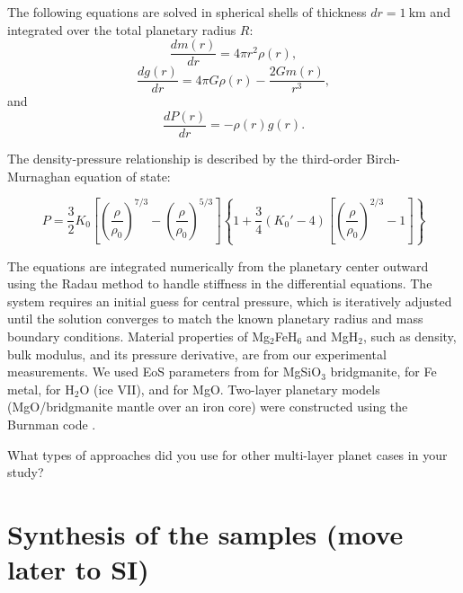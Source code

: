 \documentclass[draft,jgrga,12pt]{agujournal2019}
\begin{document}
The following equations are solved in spherical shells of thickness $dr = 1~\mathrm{km}$ and integrated over the total planetary radius $R$:
\begin{equation}
    \frac{dm(r)}{dr} = 4\pi r^2\rho (r),
\end{equation}
\begin{equation}
    \frac{dg(r)}{dr} = 4 \pi G\rho (r) -\frac{2Gm(r)}{r^3},
\end{equation}
and
\begin{equation}
    \frac{dP(r)}{dr} = -\rho (r) g (r).
\end{equation}
    
The density-pressure relationship is described by the third-order Birch-Murnaghan equation of state:

\begin{equation}
P = \frac{3}{2}K_0\left[\left(\frac{\rho}{\rho_0}\right)^{7/3} - \left(\frac{\rho}{\rho_0}\right)^{5/3}\right]\left\{1 + \frac{3}{4}(K_0' - 4)\left[\left(\frac{\rho}{\rho_0}\right)^{2/3} - 1\right]\right\}
\end{equation}

The equations are integrated numerically from the planetary center outward using the Radau method \cite{butcher_coefficients_1963} to handle stiffness in the differential equations. 
The system requires an initial guess for central pressure, which is iteratively adjusted until the solution converges to match the known planetary radius and mass boundary conditions. 
Material properties of Mg$_2$FeH$_6$ and MgH$_2$, such as density, bulk modulus, and its pressure derivative, are from our experimental measurements.
We used EoS parameters from  for MgSiO$_3$ bridgmanite,  for Fe metal,  for H$_2$O (ice VII), and  for MgO\@. 
Two-layer planetary models (MgO/bridgmanite mantle over an iron core) were constructed using the Burnman code \cite{myhill_burnman_2023}.
\begin{cbox}
What types of approaches did you use for other multi-layer planet cases in your study?
\end{cbox}


\section{Synthesis of the samples (move later to SI)}
\end{document}
